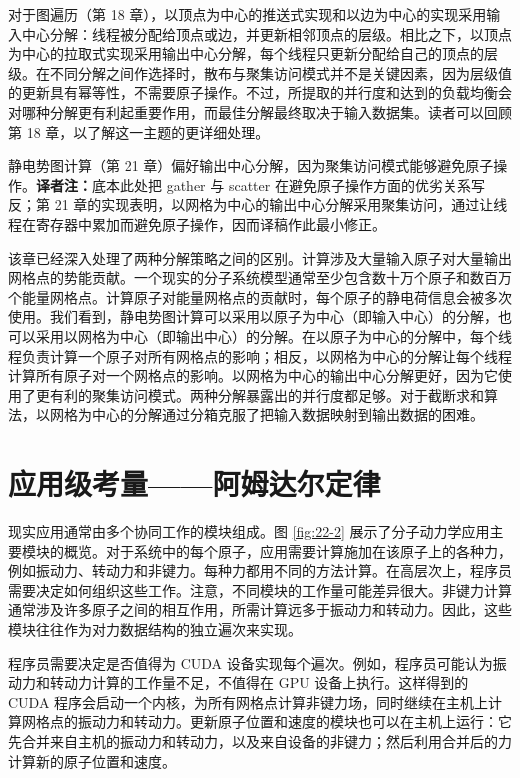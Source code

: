 对于图遍历（第 18 章），以顶点为中心的推送式实现和以边为中心的实现采用输入中心分解：线程被分配给顶点或边，并更新相邻顶点的层级。相比之下，以顶点为中心的拉取式实现采用输出中心分解，每个线程只更新分配给自己的顶点的层级。在不同分解之间作选择时，散布与聚集访问模式并不是关键因素，因为层级值的更新具有幂等性，不需要原子操作。不过，所提取的并行度和达到的负载均衡会对哪种分解更有利起重要作用，而最佳分解最终取决于输入数据集。读者可以回顾第 18 章，以了解这一主题的更详细处理。

静电势图计算（第 21 章）偏好输出中心分解，因为聚集访问模式能够避免原子操作。\noindent\textbf{译者注：}底本此处把 gather 与 scatter 在避免原子操作方面的优劣关系写反；第 21 章的实现表明，以网格为中心的输出中心分解采用聚集访问，通过让线程在寄存器中累加而避免原子操作，因而译稿作此最小修正。

该章已经深入处理了两种分解策略之间的区别。计算涉及大量输入原子对大量输出网格点的势能贡献。一个现实的分子系统模型通常至少包含数十万个原子和数百万个能量网格点。计算原子对能量网格点的贡献时，每个原子的静电荷信息会被多次使用。我们看到，静电势图计算可以采用以原子为中心（即输入中心）的分解，也可以采用以网格为中心（即输出中心）的分解。在以原子为中心的分解中，每个线程负责计算一个原子对所有网格点的影响；相反，以网格为中心的分解让每个线程计算所有原子对一个网格点的影响。以网格为中心的输出中心分解更好，因为它使用了更有利的聚集访问模式。两种分解暴露出的并行度都足够。对于截断求和算法，以网格为中心的分解通过分箱克服了把输入数据映射到输出数据的困难。

\section{应用级考量——阿姆达尔定律}
\label{sec:application-level-amdahl}

现实应用通常由多个协同工作的模块组成。图 \ref{fig:22-2} 展示了分子动力学应用主要模块的概览。对于系统中的每个原子，应用需要计算施加在该原子上的各种力，例如振动力、转动力和非键力。每种力都用不同的方法计算。在高层次上，程序员需要决定如何组织这些工作。注意，不同模块的工作量可能差异很大。非键力计算通常涉及许多原子之间的相互作用，所需计算远多于振动力和转动力。因此，这些模块往往作为对力数据结构的独立遍次来实现。

程序员需要决定是否值得为 CUDA 设备实现每个遍次。例如，程序员可能认为振动力和转动力计算的工作量不足，不值得在 GPU 设备上执行。这样得到的 CUDA 程序会启动一个内核，为所有网格点计算非键力场，同时继续在主机上计算网格点的振动力和转动力。更新原子位置和速度的模块也可以在主机上运行：它先合并来自主机的振动力和转动力，以及来自设备的非键力；然后利用合并后的力计算新的原子位置和速度。

